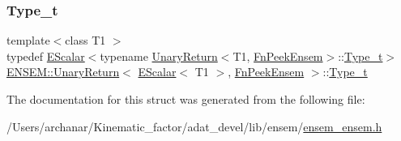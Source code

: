 \subsubsection{\texorpdfstring{Type\_t}{Type\_t}\hspace{0.1cm}{\footnotesize\ttfamily [2/2]}}
{\footnotesize\ttfamily template$<$class T1 $>$ \\
typedef \mbox{\hyperlink{classENSEM_1_1EScalar}{E\+Scalar}}$<$typename \mbox{\hyperlink{structENSEM_1_1UnaryReturn}{Unary\+Return}}$<$T1, \mbox{\hyperlink{structENSEM_1_1FnPeekEnsem}{Fn\+Peek\+Ensem}}$>$\+::\mbox{\hyperlink{structENSEM_1_1UnaryReturn_3_01EScalar_3_01T1_01_4_00_01FnPeekEnsem_01_4_a6043117f7e0aff65d845b3da0fb24d01}{Type\+\_\+t}}$>$ \mbox{\hyperlink{structENSEM_1_1UnaryReturn}{E\+N\+S\+E\+M\+::\+Unary\+Return}}$<$ \mbox{\hyperlink{classENSEM_1_1EScalar}{E\+Scalar}}$<$ T1 $>$, \mbox{\hyperlink{structENSEM_1_1FnPeekEnsem}{Fn\+Peek\+Ensem}} $>$\+::\mbox{\hyperlink{structENSEM_1_1UnaryReturn_3_01EScalar_3_01T1_01_4_00_01FnPeekEnsem_01_4_a6043117f7e0aff65d845b3da0fb24d01}{Type\+\_\+t}}}



The documentation for this struct was generated from the following file\+:\begin{DoxyCompactItemize}
\item 
/\+Users/archanar/\+Kinematic\+\_\+factor/adat\+\_\+devel/lib/ensem/\mbox{\hyperlink{lib_2ensem_2ensem__ensem_8h}{ensem\+\_\+ensem.\+h}}\end{DoxyCompactItemize}
